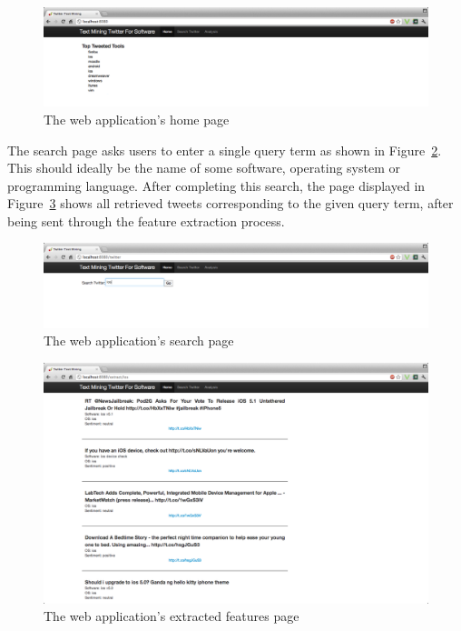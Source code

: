 \begin{figure}[h]
\begin{center}
\includegraphics[width=15cm]{gui1}
\end{center}
\caption{The web application's home page}
\label{fig:gui1}
\end{figure}

The search page asks users to enter a single query term as shown in Figure~\ref{fig:gui2}. This should ideally be the name of some software, operating system or programming language. After completing this search, the page displayed in Figure~\ref{fig:gui3} shows all retrieved tweets corresponding to the given query term, after being sent through the feature extraction process.

\begin{figure}[h]
\begin{center}
\includegraphics[width=15cm]{gui2}
\end{center}
\caption{The web application's search page}
\label{fig:gui2}
\end{figure}

\begin{figure}[h]
\begin{center}
\includegraphics[width=15cm]{gui3}
\end{center}
\caption{The web application's extracted features page}
\label{fig:gui3}
\end{figure}

